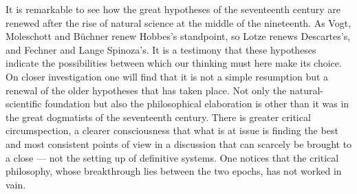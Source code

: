 \documentclass[12pt,a4paper]{book}
\newcommand{\opage}[1]{\marginnote{\footnotesize\textit{[#1]}}}
\begin{document}
It is remarkable to see how the great hypotheses of the seventeenth century are
renewed after the rise of natural science at the middle of the nineteenth. As
Vogt, Moleschott and Büchner renew Hobbes's standpoint, so Lotze renews
Descartes's, and Fechner and Lange Spinoza's. It is a testimony \opage{548}that these
hypotheses indicate the possibilities between which our thinking must here make
its choice. On closer investigation one will find that it is not a simple
resumption but a renewal of the older hypotheses that has taken place. Not only
the natural-scientific foundation but also the philosophical elaboration is other
than it was in the great dogmatists of the seventeenth century. There is greater
critical circumspection, a clearer consciousness that what is at issue is finding
the best and most consistent points of view in a discussion that can scarcely be
brought to a close --- not the setting up of definitive systems. One notices that
the critical philosophy, whose breakthrough lies between the two epochs, has not
worked in vain.
\end{document}
